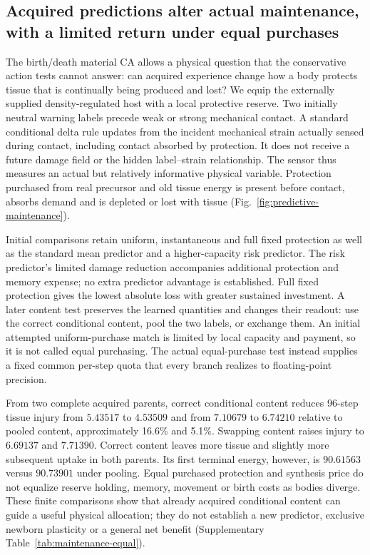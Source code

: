 \subsection*{Acquired predictions alter actual maintenance, with a limited return under equal purchases}

The birth/death material CA allows a physical question that the conservative action tests cannot answer: can acquired experience change how a body protects tissue that is continually being produced and lost? We equip the externally supplied density-regulated host with a local protective reserve. Two initially neutral warning labels precede weak or strong mechanical contact. A standard conditional delta rule updates from the incident mechanical strain actually sensed during contact, including contact absorbed by protection. It does not receive a future damage field or the hidden label--strain relationship. The sensor thus measures an actual but relatively informative physical variable. Protection purchased from real precursor and old tissue energy is present before contact, absorbs demand and is depleted or lost with tissue (Fig.~\ref{fig:predictive-maintenance}).

Initial comparisons retain uniform, instantaneous and full fixed protection as well as the standard mean predictor and a higher-capacity risk predictor. The risk predictor's limited damage reduction accompanies additional protection and memory expense; no extra predictor advantage is established. Full fixed protection gives the lowest absolute loss with greater sustained investment. A later content test preserves the learned quantities and changes their readout: use the correct conditional content, pool the two labels, or exchange them. An initial attempted uniform-purchase match is limited by local capacity and payment, so it is not called equal purchasing. The actual equal-purchase test instead supplies a fixed common per-step quota that every branch realizes to floating-point precision.

From two complete acquired parents, correct conditional content reduces 96-step tissue injury from $5.43517$ to $4.53509$ and from $7.10679$ to $6.74210$ relative to pooled content, approximately 16.6\% and 5.1\%. Swapping content raises injury to $6.69137$ and $7.71390$. Correct content leaves more tissue and slightly more subsequent uptake in both parents. Its first terminal energy, however, is $90.61563$ versus $90.73901$ under pooling. Equal purchased protection and synthesis price do not equalize reserve holding, memory, movement or birth costs as bodies diverge. These finite comparisons show that already acquired conditional content can guide a useful physical allocation; they do not establish a new predictor, exclusive newborn plasticity or a general net benefit (Supplementary Table~\ref{tab:maintenance-equal}).

